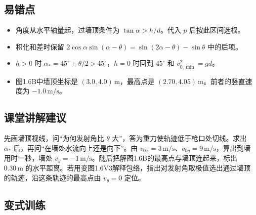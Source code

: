 \documentclass[UTF8,fontset=fandol,a4paper,11pt]{ctexart}
\begin{document}


\subsection*{易错点}

\begin{itemize}
\item 角度从水平轴量起，过墙顶条件为 $\tan\alpha>h/d$。代入 $p$ 后按此区间选根。
\item 积化和差时保留 $2\cos\alpha\sin(\alpha-\theta)=\sin(2\alpha-\theta)-\sin\theta$ 中的后项。
\item $h>0$ 时 $\alpha_*=45^\circ+\theta/2>45^\circ$，$h=0$ 时回到 $45^\circ$ 和 $v_{0,\min}^2=gd$。
\item 图1.6B中墙顶坐标是 $(3.0,4.0)\,\mathrm m$，最高点是 $(2.70,4.05)\,\mathrm m$。前者的竖直速度为 $-1.0\,\mathrm{m/s}$。
\end{itemize}



\subsection*{课堂讲解建议}

先画墙顶视线，问“为何发射角比 $\theta$ 大”，答为重力使轨迹低于枪口处切线。求出 $\alpha_*$ 后，再问“在墙处水流向上还是向下”。由 $v_{0x}=3\,\mathrm{m/s}$、$v_{0y}=9\,\mathrm{m/s}$，算出到墙用时一秒，墙处 $v_y=-1\,\mathrm{m/s}$。随后把解图1.6B的最高点与墙顶连起来，标出 $0.30\,\mathrm m$ 的水平距离。若用变图1.6V3解释包络，指出对发射角取极值选出通过墙顶的轨迹，沿这条轨迹的最高点由 $v_y=0$ 定位。



\subsection*{变式训练}
\end{document}
